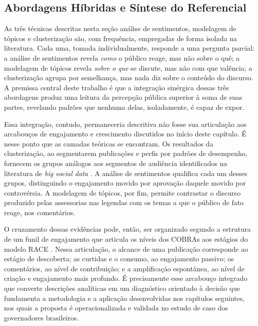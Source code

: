 \subsection{Abordagens Híbridas e Síntese do Referencial}

As três técnicas descritas nesta seção \textemdash{} análise de sentimentos, modelagem de tópicos e clusterização \textemdash{} são, com frequência, empregadas de forma isolada na literatura. Cada uma, tomada individualmente, responde a uma pergunta parcial: a análise de sentimentos revela \emph{como} o público reage, mas não sobre o quê; a modelagem de tópicos revela \emph{sobre o que} se discute, mas não com que valência; a clusterização agrupa por semelhança, mas nada diz sobre o conteúdo do discurso. A premissa central deste trabalho é que a integração sinérgica dessas três abordagens produz uma leitura da percepção pública superior à soma de suas partes, revelando padrões que nenhuma delas, isoladamente, é capaz de expor.

Essa integração, contudo, permaneceria descritiva não fosse sua articulação aos arcabouços de engajamento e crescimento discutidos no início deste capítulo. É nesse ponto que as camadas teóricas se encontram. Os resultados da clusterização, ao segmentarem publicações e perfis por padrões de desempenho, fornecem os grupos análogos aos segmentos de audiência identificados na literatura de \emph{big social data} \cite{flesch2017}. A análise de sentimentos qualifica cada um desses grupos, distinguindo o engajamento movido por aprovação daquele movido por controvérsia. A modelagem de tópicos, por fim, permite contrastar o discurso produzido pelas assessorias \textemdash{} nas legendas \textemdash{} com os temas a que o público de fato reage, nos comentários.

O cruzamento dessas evidências pode, então, ser organizado segundo a estrutura de um funil de engajamento que articula os níveis dos COBRAs \cite{muntinga2011} aos estágios do modelo RACE \cite{feroz2024}. Nessa articulação, o alcance de uma publicação corresponde ao estágio de descoberta; as curtidas e o consumo, ao engajamento passivo; os comentários, ao nível de contribuição; e a amplificação espontânea, ao nível de criação e engajamento mais profundo. É precisamente esse arcabouço integrado \textemdash{} que converte descrições analíticas em um diagnóstico orientado à decisão \textemdash{} que fundamenta a metodologia e a aplicação desenvolvidas nos capítulos seguintes, nos quais a proposta é operacionalizada e validada no estudo de caso dos governadores brasileiros.


